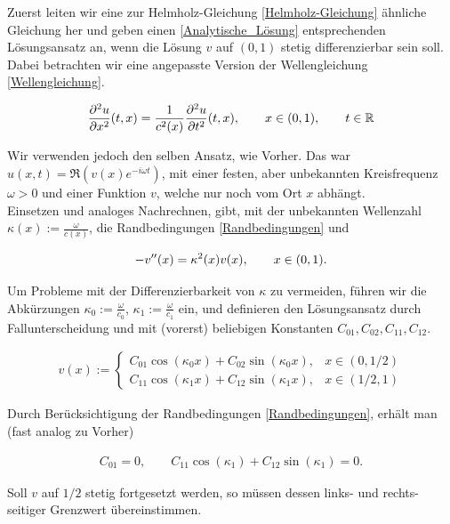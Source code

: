 Zuerst leiten wir eine zur Helmholz-Gleichung \eqref{Helmholz-Gleichung} ähnliche Gleichung her und geben einen \eqref{Analytische_Lösung} entsprechenden Lösungsansatz an, wenn die Lösung $v$ auf $(0, 1)$ stetig differenzierbar sein soll.
Dabei betrachten wir eine angepasste Version der Wellengleichung \eqref{Wellengleichung}.

\begin{align*}
  \frac{\partial^2 u}{\partial x^2} (t, x) =
  \frac{1}{c^2(x)}
  \frac{\partial^2 u}{\partial t^2} (t, x), \qquad
  x \in (0, 1), \qquad
  t \in \mathbb{R}
\end{align*}

Wir verwenden jedoch den selben Ansatz, wie Vorher. Das war $u(x, t) = \Re (v(x) e^{-i \omega t})$, mit einer festen, aber unbekannten Kreisfrequenz $\omega > 0$ und einer Funktion $v$, welche nur noch vom Ort $x$ abhängt. \\

Einsetzen und analoges Nachrechnen, gibt, mit der unbekannten Wellenzahl $\kappa(x) := \frac{\omega}{c(x)}$, die Randbedingungen \eqref{Randbedingungen} und

\begin{align*}
  -v^{\prime \prime}(x) = \kappa^2(x) v(x), \qquad
  x \in (0, 1).
\end{align*}

Um Probleme mit der Differenzierbarkeit von $\kappa$ zu vermeiden, führen wir die Abkürzungen $\kappa_0 := \frac{\omega}{c_0}$, $\kappa_1 := \frac{\omega}{c_1}$ ein, und definieren den Lösungsansatz durch Fallunterscheidung und mit (vorerst) beliebigen Konstanten $C_{01}, C_{02}, C_{11}, C_{12}$.

\begin{align*}
  v(x) :=
  \begin{cases}
    C_{01} \cos{(\kappa_0 x)} + C_{02} \sin{(\kappa_0 x)},
    & x \in (0, 1/2) \\
    C_{11} \cos{(\kappa_1 x)} + C_{12} \sin{(\kappa_1 x)},
    & x \in (1/2, 1)
  \end{cases}
\end{align*}

Durch Berücksichtigung der Randbedingungen \eqref{Randbedingungen}, erhält man (fast analog zu Vorher)

\begin{align*}
  C_{01} = 0, \qquad
  C_{11} \cos{(\kappa_1)} + C_{12} \sin{(\kappa_1)} = 0.
\end{align*}

Soll $v$ auf $1/2$ stetig fortgesetzt werden, so müssen dessen links- und rechts-seitiger Grenzwert übereinstimmen.

